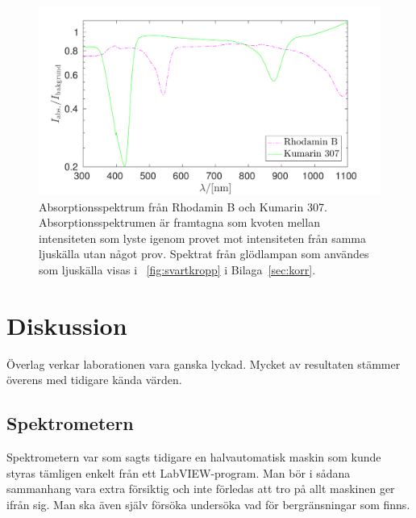\documentclass[11pt,a4paper]{article}
\newcommand{\figref}{\figurename~\ref}
\begin{document}
\begin{figure}\centering
\centerline{ %
\includegraphics[width=.9\textwidth]{absorption.pdf}
}
\caption{Absorptionsspektrum från Rhodamin B och Kumarin
  307. Absorptionsspektrumen är framtagna som kvoten mellan
  intensiteten som lyste igenom provet mot intensiteten från samma
  ljuskälla utan något prov. Spektrat från glödlampan som användes som
  ljuskälla visas i \figref{fig:svartkropp} i Bilaga~\ref{sec:korr}.
}
\label{fig:absorption} 
\end{figure}





\section{Diskussion}
Överlag verkar laborationen vara ganska lyckad. Mycket av resultaten
stämmer överens med tidigare kända värden.


\subsection{Spektrometern}
Spektrometern var som sagts tidigare en halvautomatisk maskin som
kunde styras tämligen enkelt från ett LabVIEW-program. Man bör i
sådana sammanhang vara extra försiktig och inte förledas att tro på
allt maskinen ger ifrån sig. Man ska även själv försöka undersöka vad
för bergränsningar som finns. 
\end{document}
